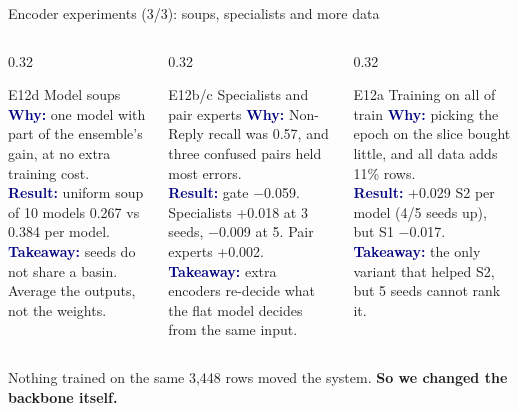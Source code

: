 \documentclass[aspectratio=169,10pt]{beamer}
\newcommand{\expsize}{\scriptsize}
\newcommand{\hl}[1]{\textcolor{accent}{\textbf{#1}}}
\newcommand{\expcard}[4]{%
  \begin{block}{#1}\expsize
    \textcolor{navy}{\textbf{Why:}} #2\\[1pt]
    \textcolor{navy}{\textbf{Result:}} #3\\[1pt]
    \textcolor{navy}{\textbf{Takeaway:}} #4
  \end{block}}
\begin{document}
\begin{frame}{Encoder experiments (3/3): soups, specialists and more data}
  \renewcommand{\expsize}{\small}
  \begin{columns}[T]
    \begin{column}{0.32\textwidth}
      \expcard{E12d \quad Model soups}
        {one model with part of the ensemble's gain, at no extra training cost.}
        {uniform soup of 10 models 0.267 vs 0.384 per model.}
        {seeds do not share a basin. Average the outputs, not the weights.}
    \end{column}
    \begin{column}{0.32\textwidth}
      \expcard{E12b/c \quad Specialists and pair experts}
        {Non-Reply recall was 0.57, and three confused pairs held most errors.}
        {gate $-$0.059. Specialists +0.018 at 3 seeds, $-$0.009 at 5. Pair experts +0.002.}
        {extra encoders re-decide what the flat model decides from the same input.}
    \end{column}
    \begin{column}{0.32\textwidth}
      \expcard{E12a \quad Training on all of train}
        {picking the epoch on the slice bought little, and all data adds 11\% rows.}
        {+0.029 S2 per model (4/5 seeds up), but S1 $-$0.017.}
        {the only variant that helped S2, but 5 seeds cannot rank it.}
    \end{column}
  \end{columns}
  \vspace{8pt}
  \centering\small Nothing trained on the same 3,448 rows moved the system. \hl{So we changed the backbone itself.}
\end{frame}
\end{document}
